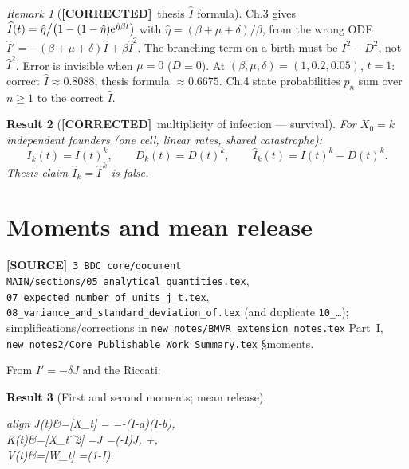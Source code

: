 \documentclass[11pt,a4paper]{article}
\newcommand{\ee}{{\rm e}}
\newcommand{\E}{\mathbb{E}}
\newcommand{\xt}{X_t}
\newcommand{\wt}{W_t}
\newcommand{\Ihat}{\widehat{I}}
\newcommand{\Aa}{A}
\newcommand{\Bb}{B}
\theoremstyle{plain}
\newtheorem{result}{Result}[section]
\theoremstyle{definition}
\theoremstyle{remark}
\newtheorem{remark}[result]{Remark}
\newcommand{\COR}{\textcolor{green!40!black}{\textbf{[CORRECTED]}}}
\newcommand{\SOURCE}{\textcolor{gray!50!black}{\textbf{[SOURCE]}}}
\begin{document}
\begin{remark}[\COR\ thesis $\Ihat$ formula]
Ch.3 gives
$\Ihat(t)=\hat\eta\big/\bigl(1-(1-\hat\eta)\ee^{\hat\eta\beta t}\bigr)$ with
$\hat\eta=(\beta+\mu+\delta)/\beta$, from the wrong ODE
$\Ihat'=-(\beta+\mu+\delta)\Ihat+\beta\Ihat^2$.
The branching term on a birth must be $I^2-D^2$, not $\Ihat^2$.
Error is invisible when $\mu=0$ ($D\equiv 0$).
At $(\beta,\mu,\delta)=(1,0.2,0.05)$, $t=1$: correct $\Ihat\approx 0.8088$,
thesis formula $\approx 0.6675$.
Ch.4 state probabilities $p_n$ sum over $n\ge 1$ to the correct $\Ihat$.
\end{remark}

\begin{result}[\COR\ multiplicity of infection --- survival]
For $X_0=k$ independent founders (one cell, linear rates, shared catastrophe):
\begin{equation}
I_k(t)=I(t)^k,\qquad
D_k(t)=D(t)^k,\qquad
\Ihat_k(t)=I(t)^k-D(t)^k.
\end{equation}
Thesis claim $\Ihat_k=\Ihat^{\,k}$ is false.
\end{result}

\section{Moments and mean release}
\label{sec:moments}
\SOURCE\
\texttt{3 BDC core/document MAIN/sections/05\_analytical\_quantities.tex},
\texttt{07\_expected\_number\_of\_units\_j\_t.tex},
\texttt{08\_variance\_and\_standard\_deviation\_of.tex}
(and duplicate \texttt{10\_\ldots});
simplifications/corrections in
\texttt{new\_notes/BMVR\_extension\_notes.tex} Part~I,
\texttt{new\_notes2/Core\_Publishable\_Work\_Summary.tex} \S moments.

From $I'=-\delta J$ and the Riccati:

\begin{result}[First and second moments; mean release]
\begin{empheq}[box=\fbox]{align}
J(t)&=\E[\xt]
=\frac{(a-b)^2\,w}{(\Bb+\Aa w)^2}
=-\frac{\beta}{\delta}(I-a)(I-b),
\label{eq:J}\\[0.35em]
K(t)&=\E[\xt^2]
=J
=\frac{2\beta}{\delta}(\kappa-I)J,
\quad {}+\frac{\delta}{2\beta},
\label{eq:K}\\[0.35em]
V(t)&=\E[\wt]
=(1-I).
\label{eq:V}
\end{empheq}
\end{result}
\end{document}
